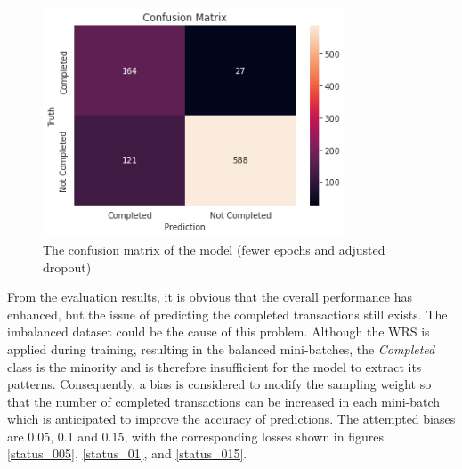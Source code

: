 \documentclass[12pt,twoside]{report}
\begin{document}
\begin{figure}[!htbp]
	\centering
	\includegraphics[width=9cm]{cm_fewer}
	\caption{The confusion matrix of the model (fewer epochs and adjusted dropout)}
	\label{status_fewer_prediction}
\end{figure}

From the evaluation results, it is obvious that the overall performance has enhanced, but the issue of predicting the completed transactions still exists. The imbalanced dataset could be the cause of this problem. Although the WRS is applied during training, resulting in the balanced mini-batches, the \textit{Completed} class is the minority and is therefore insufficient for the model to extract its patterns. Consequently, a bias is considered to modify the sampling weight so that the number of completed transactions can be increased in each mini-batch which is anticipated to improve the accuracy of predictions. The attempted biases are 0.05, 0.1 and 0.15, with the corresponding losses shown in figures \ref{status_005}, \ref{status_01}, and \ref{status_015}. 
\\
\end{document}
